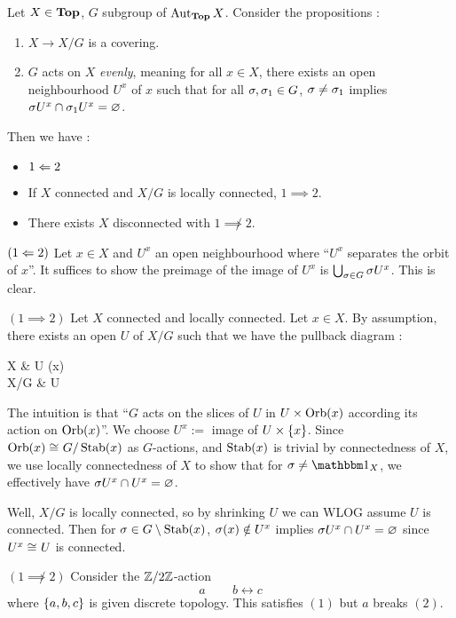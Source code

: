 \documentclass[./main.tex]{subfiles}
\begin{document}
\begin{lem}

  Let $X \in \mathbf{Top}$, $G$ subgroup of $\operatorname{Aut}_{\mathbf{Top}} X$.
  Consider the propositions : 
  \begin{enumerate}
    \item $X \to X/G$ is a covering.
    \item $G$ acts on $X$ \emph{evenly},
    meaning for all $x \in X$, 
    there exists an open neighbourhood $U^x$ of $x$ such that 
    for all $\sigma,\sigma_1 \in G$, 
    $\sigma \neq \sigma_1$ implies $\sigma U^x \cap \sigma_1 U^x = \varnothing$.
  \end{enumerate}
  Then we have :
  \begin{itemize}
    \item $1 \Leftarrow 2$
    \item If $X$ connected and $X/G$ is locally connected,
    $1 \implies 2$.
    \item There exists $X$ disconnected with $1 \not\implies 2$.
  \end{itemize}
\end{lem}
\begin{proof1}

  $(1 \Leftarrow 2)$
  Let $x \in X$ and $U^x$ an open neighbourhood where 
  ``$U^x$ separates the orbit of $x$''.
  It suffices to show the preimage of the image of $U^x$ is 
  $\bigcup_{\sigma \in G} \sigma U^x$.
  This is clear.

  $(1 \implies 2)$
  Let $X$ connected and locally connected.
  Let $x \in X$.
  By assumption, there exists an open $U$ of $X/G$ such that 
  we have the pullback diagram : 
  \begin{cd}
    X \ar[d]
      & U \times \orb(x) \ar[d] \ar[l] \\
    X/G 
      & U \ar[l,"\sups"]
  \end{cd}
  The intuition is that
  ``$G$ acts on the slices of $U$ in $U \times \operatorname{Orb}(x)$ according 
  its action on $\operatorname{Orb}(x)$''.
  We choose $U^x := $ image of $U \times \left\{x\right\}$.
  Since $\operatorname{Orb}(x) \cong_{} G / \operatorname{Stab}(x)$ as $G$-actions,
  and $\operatorname{Stab}(x)$ is trivial by connectedness of $X$,
  we use locally connectedness of $X$ to show that 
  for $\si \neq \id{X}$, 
  we effectively have $\sigma U^x \cap U^x = \varnothing$.

  Well, $X/G$ is locally connected, so by shrinking $U$ we can 
  WLOG assume $U$ is connected. 
  Then for $\sigma \in G \setminus \operatorname{Stab}(x)$,
  $\sigma(x) \notin U^x$ implies $\sigma U^x \cap U^x = \varnothing$ 
  since $U^x \cong_{} U$ is connected.

  $(1 \not\implies 2)$
  Consider the $\mathbb{Z}/2\mathbb{Z}$-action \[
    a \,\,\,\,\,\,\,\,\,\,\,\,\, b \longleftrightarrow c
  \]
  where $\left\{a,b,c\right\}$ is given discrete topology.
  This satisfies $(1)$ but $a$ breaks $(2)$.
  
\end{proof1}
\end{document}
